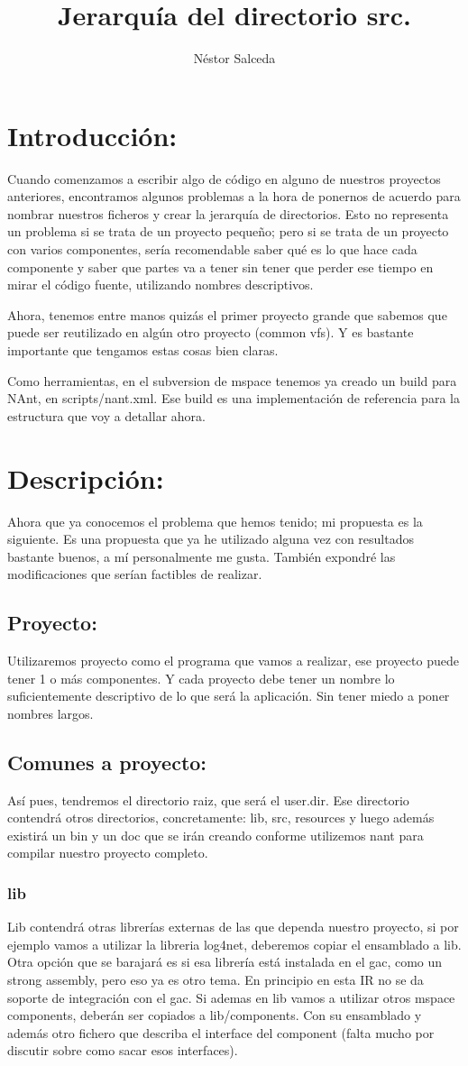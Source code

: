 \documentclass[a4paper]{article}
\author{Néstor Salceda}
\title{Jerarquía del directorio src.}
\begin{document}
\section{Introducción:}
Cuando comenzamos a escribir algo de código en alguno de nuestros proyectos
anteriores, encontramos algunos problemas a la hora de ponernos de acuerdo para
nombrar nuestros ficheros y crear la jerarquía de directorios.  Esto no
representa un problema si se trata de un proyecto pequeño; pero si se trata de
un proyecto con varios componentes, sería recomendable saber qué es lo que hace
cada componente y saber que partes va a tener sin tener que perder ese tiempo en
mirar el código fuente, utilizando nombres descriptivos.

Ahora, tenemos entre manos quizás el primer proyecto grande que sabemos que
puede ser reutilizado en algún otro proyecto (common vfs).  Y es bastante
importante que tengamos estas cosas bien claras.

Como herramientas, en el subversion de mspace tenemos ya creado un build para
NAnt, en scripts/nant.xml.  Ese build es una implementación de referencia para
la estructura que voy a detallar ahora.

\section{Descripción:}
Ahora que ya conocemos el problema  que hemos tenido; mi propuesta es la
siguiente.  Es una propuesta que ya he utilizado alguna vez con resultados
bastante buenos, a mí personalmente me gusta.  También expondré las
modificaciones que serían factibles de realizar.
\subsection{Proyecto:}
Utilizaremos proyecto como el programa que vamos a realizar, ese proyecto puede
tener 1 o más componentes.  Y cada proyecto debe tener un nombre lo
suficientemente descriptivo de lo que será la aplicación.  Sin tener miedo a
poner nombres largos.
\subsection{Comunes a proyecto:}
Así pues, tendremos el directorio raiz, que será el user.dir.  Ese directorio
contendrá otros directorios, concretamente: lib, src, resources
y luego además existirá un bin y un doc que se irán creando conforme utilizemos
nant para compilar nuestro proyecto completo.
\subsubsection{lib}
Lib contendrá otras librerías externas de las que dependa nuestro proyecto, si
por ejemplo vamos a utilizar la libreria log4net, deberemos copiar el ensamblado
a lib.
Otra opción que se barajará es si esa librería está instalada en el gac, como un
strong assembly, pero eso ya es otro tema.  En principio en esta IR no se da
soporte de integración con el gac.
Si ademas en lib vamos a utilizar otros mspace components, deberán ser copiados
a lib/components.  Con su ensamblado y además otro fichero que describa el
interface del component (falta mucho por discutir sobre como sacar esos
interfaces).
\end{document}
